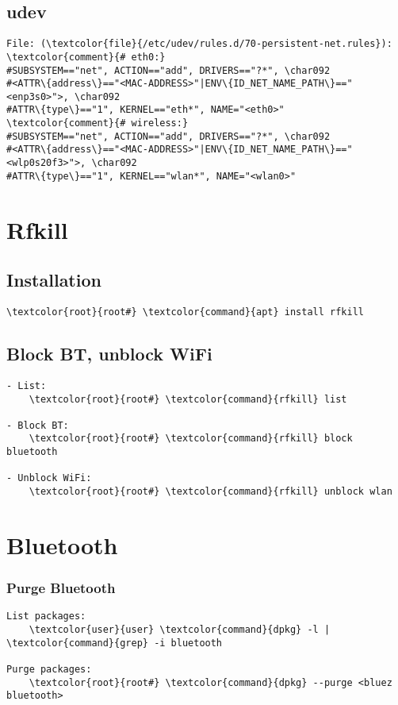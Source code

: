 \documentclass[10pt, a4paper, onecolumn, openany]{book} %
\begin{document}
\subsection{udev}
\begin{Verbatim}[commandchars=\\\{\}]
File: (\textcolor{file}{/etc/udev/rules.d/70-persistent-net.rules}):
\textcolor{comment}{# eth0:}
#SUBSYSTEM=="net", ACTION=="add", DRIVERS=="?*", \char092
#<ATTR\{address\}=="<MAC-ADDRESS>"|ENV\{ID_NET_NAME_PATH\}=="<enp3s0>">, \char092
#ATTR\{type\}=="1", KERNEL=="eth*", NAME="<eth0>"
\textcolor{comment}{# wireless:}
#SUBSYSTEM=="net", ACTION=="add", DRIVERS=="?*", \char092
#<ATTR\{address\}=="<MAC-ADDRESS>"|ENV\{ID_NET_NAME_PATH\}=="<wlp0s20f3>">, \char092
#ATTR\{type\}=="1", KERNEL=="wlan*", NAME="<wlan0>"
\end{Verbatim}


\section{Rfkill}
\subsection{Installation}
\begin{Verbatim}[commandchars=\\\{\}]
    \textcolor{root}{root#} \textcolor{command}{apt} install rfkill
\end{Verbatim}
\subsection{Block BT, unblock WiFi}
\begin{Verbatim}[commandchars=\\\{\}]
- List:
    \textcolor{root}{root#} \textcolor{command}{rfkill} list

- Block BT:
    \textcolor{root}{root#} \textcolor{command}{rfkill} block bluetooth
    
- Unblock WiFi:
    \textcolor{root}{root#} \textcolor{command}{rfkill} unblock wlan
\end{Verbatim}

\section{Bluetooth}
\subsubsection{Purge Bluetooth}
\begin{Verbatim}[commandchars=\\\{\}]
List packages:
    \textcolor{user}{user} \textcolor{command}{dpkg} -l | \textcolor{command}{grep} -i bluetooth

Purge packages:
    \textcolor{root}{root#} \textcolor{command}{dpkg} --purge <bluez bluetooth>
\end{Verbatim}
\end{document}

